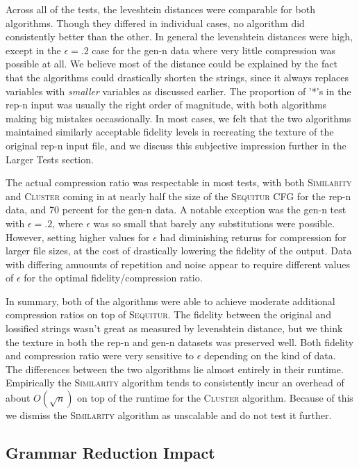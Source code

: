 \documentclass[11pt]{article}
\newcommand{\Sequitur}{\textsc{Sequitur}\xspace}
\newcommand{\Similarity}{\textsc{Similarity}\xspace}
\newcommand{\Cluster}{\textsc{Cluster}\xspace}
\begin{document}
Across all of the tests, the leveshtein
distances were comparable for both algorithms. Though they differed in
individual cases, no algorithm did consistently better than the other.
In general the levenshtein distances were high, except in the $\epsilon=.2$
case for the gen-n data where very little compression was possible at all.
We believe most of the distance could be explained by
the fact that the algorithms could drastically shorten
the strings, since it always replaces variables with \emph{smaller} variables
as discussed earlier.
The proportion of '*'s in the rep-n input
was usually the right order of magnitude, with both algorithms making big
mistakes occassionally. In most cases, we felt that the two algorithms maintained similarly
acceptable fidelity levels in recreating the texture of the original rep-n
input file, and we discuss this subjective impression further in the
Larger Tests section.


The actual compression ratio was respectable in most tests, with both \Similarity and \Cluster
coming in at nearly half the size of the \Sequitur CFG for the rep-n data,
and 70 percent for the gen-n data. A notable exception was
the gen-n test with $\epsilon=.2$, where $\epsilon$ was so small that barely
any substitutions were possible.
However, setting higher values
for $\epsilon$ had diminishing returns for compression for larger
file sizes, at the cost of drastically lowering the fidelity of the output.
Data with differing amuounts of repetition and noise
appear to require different values of $\epsilon$ for the optimal fidelity/compression ratio.

In summary, both of the algorithms were able to achieve moderate additional compression ratios
on top of \Sequitur. The fidelity between the original and lossified strings
wasn't great as measured by levenshtein distance, but we think the texture in both the
rep-n and gen-n datasets was preserved well. Both fidelity and compression ratio were
very sensitive to $\epsilon$ depending on the kind of data.
The differences between the two algorithms lie almost entirely in their
runtime. Empirically the \Similarity algorithm tends to
consistently incur an overhead of about $O(\sqrt{n})$ on top of the runtime for
the \Cluster algorithm. Because of this we dismiss the \Similarity algorithm as
unscalable and do not test it further.

\subsection{Grammar Reduction Impact}
\end{document}

